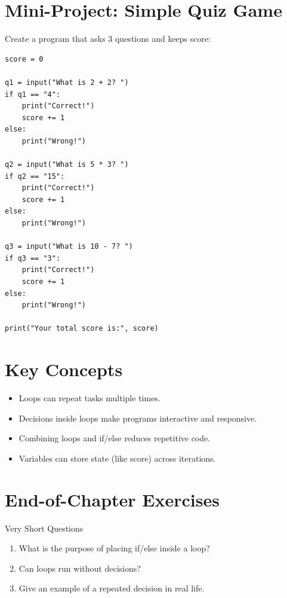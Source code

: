 \section{Mini-Project: Simple Quiz Game}

Create a program that asks 3 questions and keeps score:

\begin{verbatim}
score = 0

q1 = input("What is 2 + 2? ")
if q1 == "4":
    print("Correct!")
    score += 1
else:
    print("Wrong!")

q2 = input("What is 5 * 3? ")
if q2 == "15":
    print("Correct!")
    score += 1
else:
    print("Wrong!")

q3 = input("What is 10 - 7? ")
if q3 == "3":
    print("Correct!")
    score += 1
else:
    print("Wrong!")

print("Your total score is:", score)
\end{verbatim}

\section{Key Concepts}

\begin{itemize}
    \item Loops can repeat tasks multiple times.  
    \item Decisions inside loops make programs interactive and responsive.  
    \item Combining loops and if/else reduces repetitive code.  
    \item Variables can store state (like score) across iterations.  
\end{itemize}

\section{End-of-Chapter Exercises}

\begin{exercise}{Very Short Questions}
\begin{enumerate}
    \item What is the purpose of placing if/else inside a loop?  
    \item Can loops run without decisions?  
    \item Give an example of a repeated decision in real life.  
\end{enumerate}
\end{exercise}

